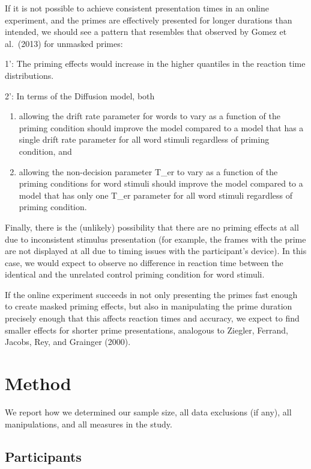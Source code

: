 \documentclass[
  english,
  man]{apa6}
\begin{document}
If it is not possible to achieve consistent presentation times in an online experiment, and the primes are effectively presented for longer durations than intended, we should see a pattern that resembles that observed by Gomez et al.~(2013) for unmasked primes:

1': The priming effects would increase in the higher quantiles in the reaction time distributions.

2': In terms of the Diffusion model, both

\begin{enumerate}
\def\labelenumi{\alph{enumi})}
\item
  allowing the drift rate parameter for words to vary as a function of the priming condition should improve the model compared to a model that has a single drift rate parameter for all word stimuli regardless of priming condition, and
\item
  allowing the non-decision parameter T\_er to vary as a function of the priming conditions for word stimuli should improve the model compared to a model that has only one T\_er parameter for all word stimuli regardless of priming condition.
\end{enumerate}

Finally, there is the (unlikely) possibility that there are no priming effects at all due to inconsistent stimulus presentation (for example, the frames with the prime are not displayed at all due to timing issues with the participant's device). In this case, we would expect to observe no difference in reaction time between the identical and the unrelated control priming condition for word stimuli.

If the online experiment succeeds in not only presenting the primes fast enough to create masked priming effects, but also in manipulating the prime duration precisely enough that this affects reaction times and accuracy, we expect to find smaller effects for shorter prime presentations, analogous to Ziegler, Ferrand, Jacobs, Rey, and Grainger (2000).

\hypertarget{method}{%
\section{Method}\label{method}}

We report how we determined our sample size, all data exclusions (if any), all manipulations, and all measures in the study.

\hypertarget{participants}{%
\subsection{Participants}\label{participants}}
\end{document}
